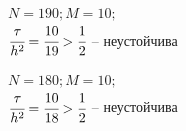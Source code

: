 \documentclass[12pt]{extarticle}
\numberwithin{equation}{section}
\begin{document}
\begin{figure}[H]
\begin{minipage}[h]{0.43\linewidth}
 $N=190; M=10;$\\$ \cfrac{\tau}{h^2} = \cfrac{10}{19} > \cfrac{1}{2}$ -- неустойчива
\end{minipage}
\hfill
\begin{minipage}[h]{0.43\linewidth}
 $N=180; M=10;$\\$ \cfrac{\tau}{h^2} = \cfrac{10}{18} > \cfrac{1}{2}$ -- неустойчива
\end{minipage}
\end{figure}
\end{document}

